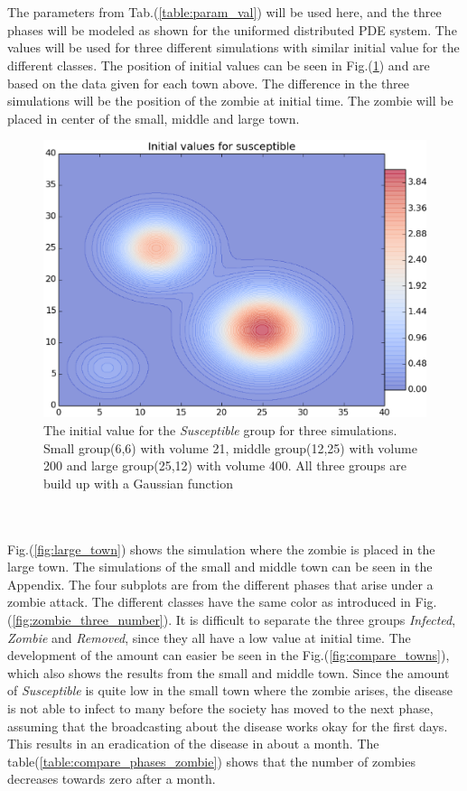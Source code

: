 \documentclass[%
twoside,                 %
final,                   %
10pt]{article}
\begin{document}
\noindent
\\
\\
The parameters from Tab.(\ref{table:param_val}) will be used here, and the three phases will be modeled as shown for the uniformed distributed PDE system. The values will be used for three different simulations with similar initial value for the different classes. The position of initial values can be seen in Fig.(\ref{fig:initial_value_susceptible}) and are based on the data given for each town above. The difference in the three simulations will be the position of the zombie at initial time. The zombie will be placed in center of the small, middle and large town.


\begin{figure}[ht]
  \centerline{\includegraphics[width=0.8\linewidth]{plots/initial_value_susceptible.eps}}
  \caption{
  \label{fig:initial_value_susceptible} The initial value for the \emph{Susceptible} group for three simulations. Small group(6,6) with volume 21, middle group(12,25) with volume 200 and large group(25,12) with volume 400. All three groups are build up with a Gaussian function
  }
\end{figure}


\\
\\
Fig.(\ref{fig:large_town}) shows the simulation where the zombie is placed in the large town. The simulations of the small and middle town can be seen in the Appendix. The four subplots are from the different phases that arise under a zombie attack. The different classes have the same color as introduced in Fig.(\ref{fig:zombie_three_number}). It is difficult to separate the three groups \emph{Infected}, \emph{Zombie} and \emph{Removed}, since they all have a low value at initial time. The development of the amount can easier be seen in the Fig.(\ref{fig:compare_towns}), which also shows the results from the small and middle town. Since the amount of \emph{Susceptible} is quite low in the small town where the zombie arises, the disease is not able to infect to many before the society has moved to the next phase, assuming that the broadcasting about the disease works okay for the first days. This results in an eradication of the disease in about a month. The table(\ref{table:compare_phases_zombie}) shows that the number of zombies decreases towards zero after a month. 
\end{document}
